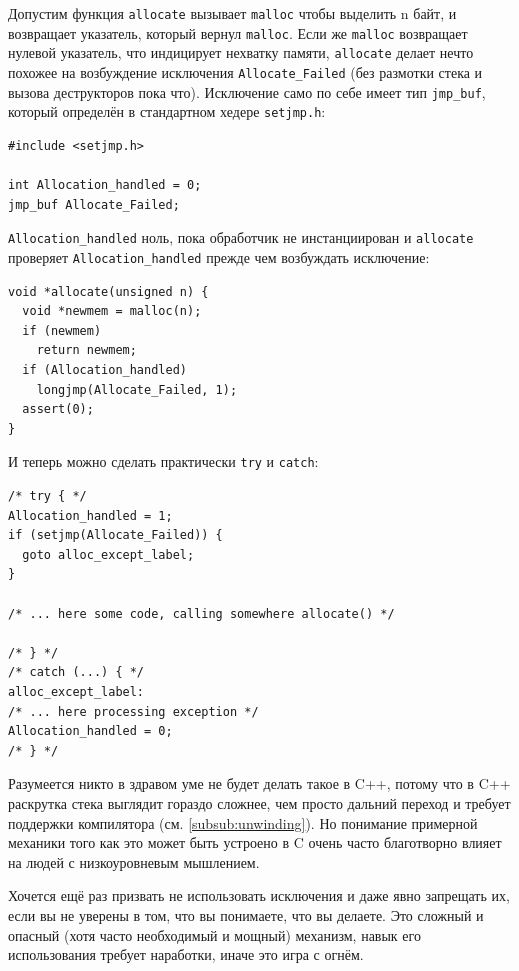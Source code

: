 \documentclass[a4paper,12pt,oneside]{book}
\begin{document}
Допустим функция \lstinline!allocate! вызывает \lstinline!malloc! чтобы выделить n байт, и возвращает указатель, который вернул \lstinline!malloc!. Если же \lstinline!malloc! возвращает нулевой указатель, что индицирует нехватку памяти, \lstinline!allocate! делает нечто похожее на возбуждение исключения \lstinline!Allocate_Failed! (без размотки стека и вызова деструкторов пока что). Исключение само по себе имеет тип \lstinline!jmp_buf!, который определён в стандартном хедере \lstinline!setjmp.h!:

\begin{lstlisting}
#include <setjmp.h>

int Allocation_handled = 0;
jmp_buf Allocate_Failed;
\end{lstlisting}

\lstinline!Allocation_handled! ноль, пока обработчик не инстанциирован и \lstinline!allocate! проверяет \lstinline!Allocation_handled! прежде чем возбуждать исключение:

\begin{lstlisting}
void *allocate(unsigned n) {
  void *newmem = malloc(n);
  if (newmem)
    return newmem;
  if (Allocation_handled)
    longjmp(Allocate_Failed, 1);
  assert(0);
}
\end{lstlisting}

И теперь можно сделать практически \lstinline!try! и \lstinline!catch!:

\begin{lstlisting}
/* try { */
Allocation_handled = 1;
if (setjmp(Allocate_Failed)) {
  goto alloc_except_label;
}

/* ... here some code, calling somewhere allocate() */

/* } */
/* catch (...) { */
alloc_except_label:
/* ... here processing exception */
Allocation_handled = 0;
/* } */
\end{lstlisting}

Разумеется никто в здравом уме не будет делать такое в C++, потому что в C++ раскрутка стека выглядит гораздо сложнее, чем просто дальний переход и требует поддержки компилятора (см. \ref{subsub:unwinding}). Но понимание примерной механики того как это может быть устроено в C очень часто благотворно влияет на людей с низкоуровневым мышлением.

Хочется ещё раз призвать не использовать исключения и даже явно запрещать их, если вы не уверены в том, что вы понимаете, что вы делаете. Это сложный и опасный (хотя часто необходимый и мощный) механизм, навык его использования требует наработки, иначе это игра с огнём.
\end{document}
